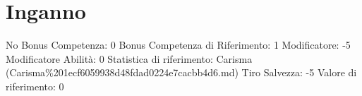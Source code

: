 \section{Inganno}\label{inganno}

\begin{description}
\tightlist
\item[Tags: ABI]
No Bonus Competenza: 0 Bonus Competenza di Riferimento: 1 Modificatore:
-5 Modificatore Abilità: 0 Statistica di riferimento: Carisma
(Carisma\%201ecf6059938d48fdad0224e7cacbb4d6.md) Tiro Salvezza: -5
Valore di riferimento: 0
\end{description}
